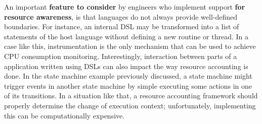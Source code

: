 An important \textbf{feature to consider} by engineers who implement support \textbf{for resource awareness},
is that languages do not always provide well-defined boundaries.
For instance, an internal DSL may be transformed into a list of statements of the host language without defining a new routine or thread.
In a case like this, instrumentation is the only mechanism that can be used to achieve CPU consumption monitoring.
Interestingly, interaction between parts of a application written using DSLs can also impact the way resource accounting is done.
In the state machine example previously discussed, a state machine might trigger events in another state machine by simple executing some actions in one of its transitions.
In a situation like that, a resource accounting framework should properly determine the change of execution context; unfortunately, implementing this can be computationally expensive. 




%
%
%


